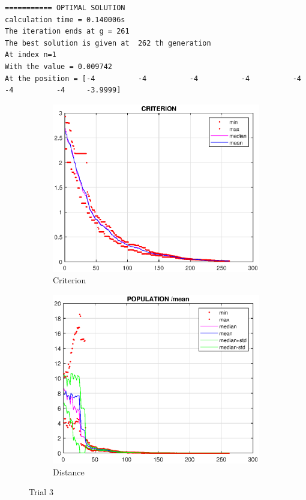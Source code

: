\documentclass{CSArticle}[english]
\begin{document}
\begin{lstlisting}[style=RESULT,caption={trial 3}]
=========== OPTIMAL SOLUTION
calculation time = 0.140006s 
The iteration ends at g = 261 
The best solution is given at  262 th generation 
At index n=1 
With the value = 0.009742 
At the position = [-4          -4          -4          -4          -4          -4          -4     -3.9999] 
\end{lstlisting}
\begin{figure}[h!]
\centering
\begin{subfigure}[b]{0.45\textwidth}
         \centering
         \includegraphics[scale=0.45]{figure/Q5_c3.eps}
         \caption{Criterion}
         \label{fig:Q5_c3}
     \end{subfigure}
     \hfill
     \begin{subfigure}[b]{0.45\textwidth}
         \centering
         \includegraphics[scale=0.45]{figure/Q5_p3.eps}
         \caption{Distance}
         \label{fig:Q5_p3}
     \end{subfigure}
     \caption{Trial 3}
     \label{fig:trial3}
\end{figure}
\end{document}
